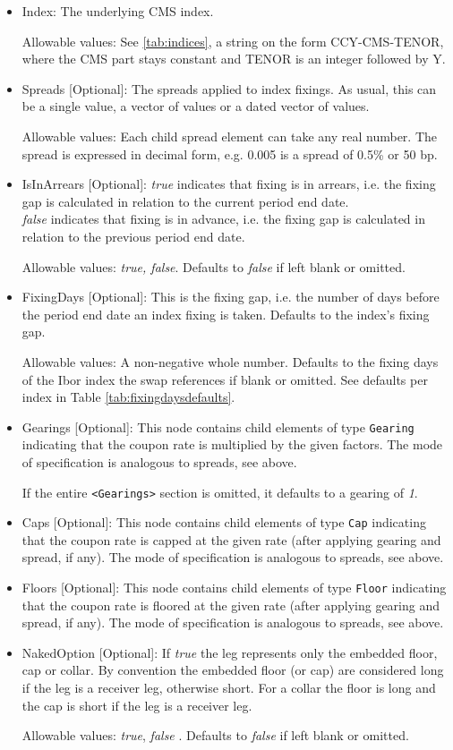 \begin{itemize}
\item Index: The underlying CMS index.

Allowable values:  See \ref{tab:indices}, a string on the form CCY-CMS-TENOR, where the CMS part stays constant and TENOR is an integer followed by Y.

\item Spreads [Optional]: The spreads applied to index fixings. As usual, this can be a single value, a vector of values or a dated vector of
  values.
  
  Allowable values: Each child spread element can take any real number. The spread is expressed in decimal form, e.g. 0.005 is
  a spread of 0.5\% or 50 bp. 
    
\item IsInArrears [Optional]:  \emph{true} indicates that  fixing is in arrears, 
  i.e. the fixing gap is calculated in relation to the current period
  end date.\\ \emph{false} indicates that  fixing is in advance,
  i.e. the fixing gap is calculated in relation to the previous period
  end date.
  
Allowable values:  \emph{true, false}. Defaults to \emph{false} if left blank or omitted.
  
\item FixingDays [Optional]: This is the fixing gap, i.e. the number of days
  before the period end date an index fixing is taken. Defaults to the index's fixing gap.
  
    Allowable values: A non-negative whole number.  Defaults to the fixing days of the Ibor index the swap references if blank or omitted. See defaults per index in Table \ref{tab:fixingdaysdefaults}.
  
\item Gearings [Optional]: This node contains child elements of type \lstinline!Gearing! indicating that the coupon rate is
  multiplied by the given factors. The mode of specification is analogous to spreads, see above.
  
  If the entire {\tt <Gearings>} section is omitted, it defaults to a gearing of \emph{1}.
  
\item Caps [Optional]: This node contains child elements of type \lstinline!Cap! indicating that the coupon rate is capped at the
  given rate (after applying gearing and spread, if any). The mode of specification is analogous to spreads, see above.
\item Floors [Optional]: This node contains child elements of type \lstinline!Floor! indicating that the coupon rate is floored at
  the given rate (after applying gearing and spread, if any). The mode of specification is analogous to spreads, see
  above.
\item NakedOption [Optional]: If \emph{true} the leg represents only the embedded floor, cap or collar.
  By convention the embedded floor (or cap) are considered long if the leg is a receiver leg, otherwise short. For a
  collar the floor is long and the cap is short if the leg is a receiver leg.
  
Allowable values: \emph{true}, \emph{false} . Defaults to \emph{false} if left blank or omitted.


\end{itemize}
